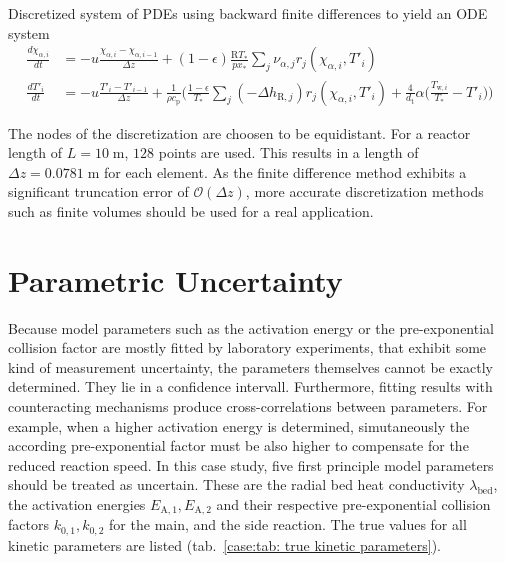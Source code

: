 \begin{definition} Discretized system of PDEs using backward finite differences to yield an ODE system
    \label{case:def: discretized system of PDEs}
    \[
    \begin{aligned}
        \frac{d \chi_{\alpha,i}}{d t} &= - u \frac{\chi_{\alpha,i} - \chi_{\alpha,i-1}}{\Delta z}
        + (1 - \epsilon) \frac{\mathrm{R} T_*}{p x_*} \sum_j \nu_{\alpha,j} r_j(\chi_{\alpha,i}, T'_i) \\
        \frac{d T'_i}{dt} &= -u \frac{T'_{i} - T'_{i-1}}{\Delta z} +
        \frac{1}{\rho c_\text{p}} \bigg ( \frac{1-\epsilon}{T_*} \sum_j (-\Delta h_{\text{R},j}) r_j(\chi_{\alpha,i}, T'_i)
        + \frac{4}{d_\text{t}}  \alpha \big (\frac{T_{\text{w},i}}{T_*} - T'_i \big) \bigg)
    \end{aligned}
    \]
\end{definition}
\noindent
The nodes of the discretization are choosen to be equidistant. For a reactor length of $L=10 \; \mathrm{m}$, $128$
points are used. This results in a length of $\Delta z = 0.0781 \; \mathrm{m}$ for each element.
As the finite difference method exhibits a significant truncation error of $\mathcal{O}(\Delta z)$, more accurate discretization
methods such as finite volumes should be used for a real application.

\section{Parametric Uncertainty}

Because model parameters such as the activation energy or the pre-exponential collision factor are mostly fitted
by laboratory experiments, that exhibit some kind of measurement uncertainty, the parameters themselves cannot be
exactly determined. They lie in a confidence intervall. Furthermore, fitting results with counteracting mechanisms
produce cross-correlations between parameters. For example, when a higher activation energy is determined, simutaneously
the according pre-exponential factor must be also higher to compensate for the reduced reaction speed. In this case study,
five first principle model parameters should be treated as uncertain. These are the radial bed heat conductivity $\lambda_\text{bed}$,
the activation energies $E_{\text{A},1}, E_{\text{A},2}$ and their respective pre-exponential collision factors $k_{0,1}, k_{0,2}$ for the main, and the side reaction.
The true values for all kinetic parameters are listed (tab.~\ref{case:tab: true kinetic parameters}).

